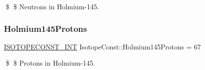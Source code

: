 \$ \$ Neutrons in Holmium-\/145. \mbox{\label{group___isotope_const-_holmium-_ho145_ga9afe1a32db2c78e61bd8dcf2673498d0}} 
\subsubsection{\texorpdfstring{Holmium145\+Protons}{Holmium145Protons}}
{\footnotesize\ttfamily \mbox{\hyperlink{group___isotope_const-_macros_ga5f18360b3e99483a35c32d789e62621c}{I\+S\+O\+T\+O\+P\+E\+C\+O\+N\+S\+T\+\_\+\+I\+NT}} Isotope\+Const\+::\+Holmium145\+Protons = 67}

\$ \$ Protons in Holmium-\/145. 